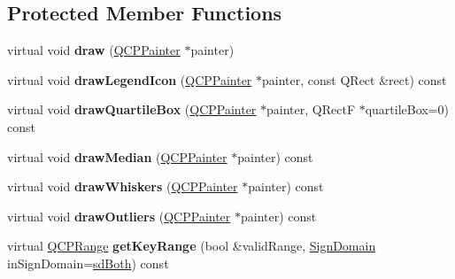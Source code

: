 \subsection*{Protected Member Functions}
\begin{DoxyCompactItemize}
\item 
\hypertarget{classQCPStatisticalBox_a753b62761217dd6b92f8a29e286a1317}{virtual void {\bfseries draw} (\hyperlink{classQCPPainter}{Q\-C\-P\-Painter} $\ast$painter)}\label{classQCPStatisticalBox_a753b62761217dd6b92f8a29e286a1317}

\item 
\hypertarget{classQCPStatisticalBox_af010b2f9e32b8183984486e4d66e46c4}{virtual void {\bfseries draw\-Legend\-Icon} (\hyperlink{classQCPPainter}{Q\-C\-P\-Painter} $\ast$painter, const Q\-Rect \&rect) const }\label{classQCPStatisticalBox_af010b2f9e32b8183984486e4d66e46c4}

\item 
\hypertarget{classQCPStatisticalBox_a9ad0abdb154fefb04e9872f0db8e2ec7}{virtual void {\bfseries draw\-Quartile\-Box} (\hyperlink{classQCPPainter}{Q\-C\-P\-Painter} $\ast$painter, Q\-Rect\-F $\ast$quartile\-Box=0) const }\label{classQCPStatisticalBox_a9ad0abdb154fefb04e9872f0db8e2ec7}

\item 
\hypertarget{classQCPStatisticalBox_a16fef8bc19e5a09d82033edcfe919495}{virtual void {\bfseries draw\-Median} (\hyperlink{classQCPPainter}{Q\-C\-P\-Painter} $\ast$painter) const }\label{classQCPStatisticalBox_a16fef8bc19e5a09d82033edcfe919495}

\item 
\hypertarget{classQCPStatisticalBox_a6f8d093ec7e404529388d02da4c72b34}{virtual void {\bfseries draw\-Whiskers} (\hyperlink{classQCPPainter}{Q\-C\-P\-Painter} $\ast$painter) const }\label{classQCPStatisticalBox_a6f8d093ec7e404529388d02da4c72b34}

\item 
\hypertarget{classQCPStatisticalBox_a60ebb332a497f51ace837767db5105b9}{virtual void {\bfseries draw\-Outliers} (\hyperlink{classQCPPainter}{Q\-C\-P\-Painter} $\ast$painter) const }\label{classQCPStatisticalBox_a60ebb332a497f51ace837767db5105b9}

\item 
\hypertarget{classQCPStatisticalBox_a2f66940ae92d7ad438834c861fc2d57f}{virtual \hyperlink{classQCPRange}{Q\-C\-P\-Range} {\bfseries get\-Key\-Range} (bool \&valid\-Range, \hyperlink{classQCPAbstractPlottable_a661743478a1d3c09d28ec2711d7653d8}{Sign\-Domain} in\-Sign\-Domain=\hyperlink{classQCPAbstractPlottable_a661743478a1d3c09d28ec2711d7653d8a082b98cfb91a7363a3b5cd17b0c1cd60}{sd\-Both}) const }\label{classQCPStatisticalBox_a2f66940ae92d7ad438834c861fc2d57f}


\end{DoxyCompactItemize}
